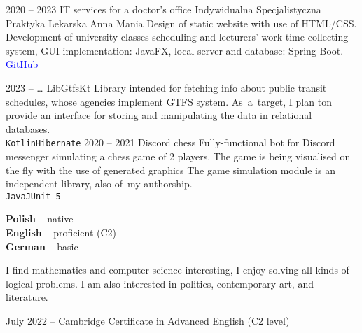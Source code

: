 \documentclass[8pt]{developercv} %
\begin{document}


\begin{entrylist}
  \entry
    {2020 -- 2023}
    {IT services for a doctor's office}
    {Indywidualna Specjalistyczna Praktyka Lekarska Anna Mania}
    {
      Design of static website with use of HTML/CSS.
      Development of university classes scheduling and lecturers' work time collecting system,
      GUI implementation: JavaFX, local server and database: Spring Boot.
      \href{https://github.com/pulkowski-jan/timetablescheduler}{
        \textcolor{blue}{\underline{GitHub}}
      }
    }
\end{entrylist}


\begin{entrylist}
  \entry
    {2023 -- \ldots}
    {LibGtfsKt}
    {}
    {
      Library intended for fetching info about public transit schedules, whose agencies implement GTFS system.
      As~a~target, I plan ton provide an interface for storing and manipulating the data in relational databases.
      \\\texttt{Kotlin}\slashsep\texttt{Hibernate}
    }
  \entry
    {2020 -- 2021}
    {Discord chess}
    {}
    {
      Fully-functional bot for Discord messenger simulating a chess game of 2 players.
      The game is being visualised on the fly with the use of generated graphics
      The game simulation module is an independent library, also of~my authorship.
      \\\texttt{Java}\slashsep\texttt{JUnit 5}
    }
\end{entrylist}



\begin{minipage}[t]{0.3\textwidth}
  \vspace{-\baselineskip}


  \textbf{Polish} -- native\\
  \textbf{English} -- proficient (C2)\\
  \textbf{German} -- basic
\end{minipage}
\hfill
\begin{minipage}[t]{0.3\textwidth}
  \vspace{-\baselineskip}

  I find mathematics and computer science interesting,
  I enjoy solving all kinds of logical problems.
  I am also interested in politics, contemporary art, and literature.
\end{minipage}
\hfill
\begin{minipage}[t]{0.35\textwidth}
  \vspace{-\baselineskip}

  July 2022 -- Cambridge Certificate in Advanced English (C2 level)
\end{minipage}
\end{document}
